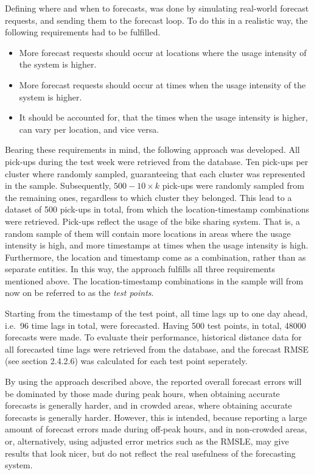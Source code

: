 \documentclass[12pt,oneside]{reedthesis}
\providecommand{\tightlist}{%
  \setlength{\itemsep}{0pt}\setlength{\parskip}{0pt}}
\begin{document}
Defining where and when to forecasts, was done by simulating real-world
forecast requests, and sending them to the forecast loop. To do this in
a realistic way, the following requirements had to be fulfilled.
\begin{itemize}
\tightlist
\item
  More forecast requests should occur at locations where the usage
  intensity of the system is higher.
\item
  More forecast requests should occur at times when the usage intensity
  of the system is higher.
\item
  It should be accounted for, that the times when the usage intensity is
  higher, can vary per location, and vice versa.
\end{itemize}
Bearing these requirements in mind, the following approach was
developed. All pick-ups during the test week were retrieved from the
database. Ten pick-ups per cluster where randomly sampled, guaranteeing
that each cluster was represented in the sample. Subsequently,
\(500-10 \times k\) pick-ups were randomly sampled from the remaining
ones, regardless to which cluster they belonged. This lead to a dataset
of 500 pick-ups in total, from which the location-timestamp combinations
were retrieved. Pick-ups reflect the usage of the bike sharing system.
That is, a random sample of them will contain more locations in areas
where the usage intensity is high, and more timestamps at times when the
usage intensity is high. Furthermore, the location and timestamp come as
a combination, rather than as separate entities. In this way, the
approach fulfills all three requirements mentioned above. The
location-timestamp combinations in the sample will from now on be
referred to as the \emph{test points}.

Starting from the timestamp of the test point, all time lags up to one
day ahead, i.e.~96 time lags in total, were forecasted. Having 500 test
points, in total, 48000 forecasts were made. To evaluate their
performance, historical distance data for all forecasted time lags were
retrieved from the database, and the forecast RMSE (see section 2.4.2.6)
was calculated for each test point seperately.

By using the approach described above, the reported overall forecast
errors will be dominated by those made during peak hours, when obtaining
accurate forecasts is generally harder, and in crowded areas, where
obtaining accurate forecasts is generally harder. However, this is
intended, because reporting a large amount of forecast errors made
during off-peak hours, and in non-crowded areas, or, alternatively,
using adjusted error metrics such as the RMSLE, may give results that
look nicer, but do not reflect the real usefulness of the forecasting
system.
\end{document}
